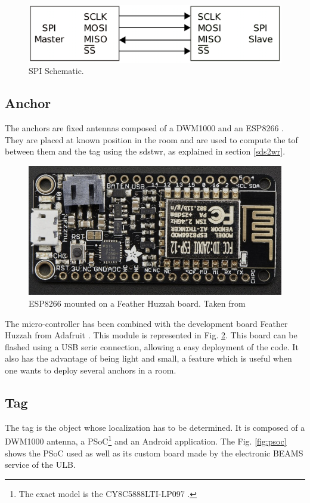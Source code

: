 \begin{figure}[H]
	\centering
	\includegraphics[width=.6\linewidth]{Images/SPI_scheme.png}
	\caption{SPI Schematic.}
	\label{fig:spi_scheme}
\end{figure}

\subsection{Anchor}

The anchors are fixed antennas composed of a DWM1000 and an ESP8266 \cite{esp8266}. They are placed at known position in the room and are used to compute the \gls{tof} between them and the tag using the \gls{sdstwr}, as explained in section \ref{sds2wr}. 

\begin{figure}[H]
	\centering
	\includegraphics[width=.6\linewidth]{Images/esp8266.png}
	\caption{ESP8266 mounted on a Feather Huzzah board. Taken from \cite{adafruit}}
	\label{fig:esp8266}
\end{figure}

The micro-controller has been combined with the development board Feather Huzzah from Adafruit \cite{adafruit}. This module is represented in Fig. \ref{fig:esp8266}. This board can be flashed using a USB serie connection, allowing a easy deployment of the code. It also has the advantage of being light and small, a feature which is useful when one wants to deploy several anchors in a room. 

\subsection{Tag}

The tag is the object whose localization has to be determined. It is composed of a DWM1000 antenna, a PSoC\footnote{The exact model is the CY8C5888LTI-LP097 \cite{guyard2019navigation}.} and an Android application. The Fig. \ref{fig:psoc} shows the PSoC used as well as its custom board made by the electronic BEAMS service of the ULB.
\vspace{2mm}

